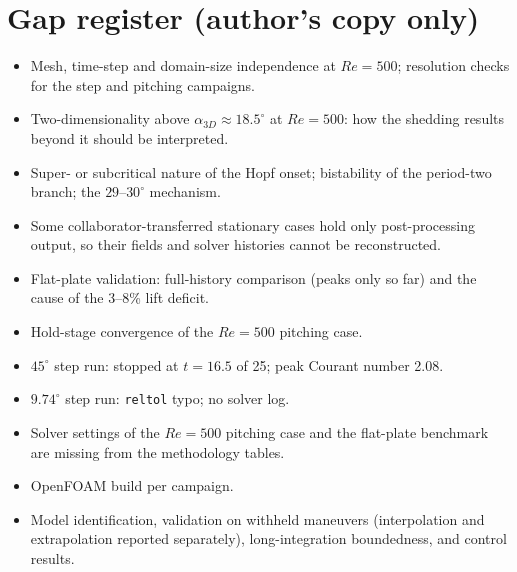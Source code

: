 \section*{Gap register (author's copy only)}
\begin{itemize}\small
\item Mesh, time-step and domain-size independence at $Re=500$; resolution checks for the step and pitching campaigns.
\item Two-dimensionality above $\alpha_{3D}\approx18.5^\circ$ at $Re=500$: how the shedding results beyond it should be interpreted.
\item Super- or subcritical nature of the Hopf onset; bistability of the period-two branch; the $29$--$30^\circ$ mechanism.
\item Some collaborator-transferred stationary cases hold only post-processing output, so their fields and solver histories cannot be reconstructed.
\item Flat-plate validation: full-history comparison (peaks only so far) and the cause of the 3--8\% lift deficit.
\item Hold-stage convergence of the $Re=500$ pitching case.
\item $45^\circ$ step run: stopped at $t=16.5$ of 25; peak Courant number 2.08.
\item $9.74^\circ$ step run: \texttt{reltol} typo; no solver log.
\item Solver settings of the $Re=500$ pitching case and the flat-plate benchmark are missing from the methodology tables.
\item OpenFOAM build per campaign.
\item Model identification, validation on withheld maneuvers (interpolation and extrapolation reported separately), long-integration boundedness, and control results.
\end{itemize}
